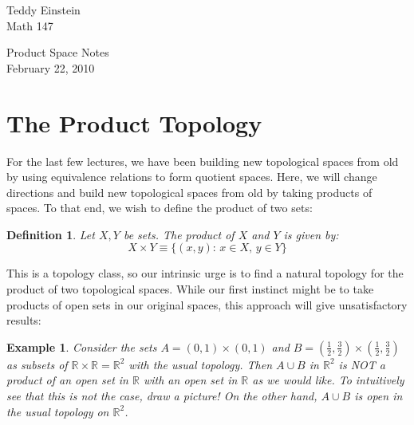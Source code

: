 \documentclass[reqno]{amsart}
\newcommand{\reals}{\mathbb{R}}
\newcommand{\half}[1]{\frac{#1}{2}}
\newtheorem{definition}[theorem]{Definition}
\newtheorem{example}[theorem]{Example}
\begin{document}
\noindent Teddy Einstein\\Math 147\\
\begin{center}
Product Space Notes\\
February 22, 2010 \\
\end{center}
\renewcommand{\labelenumi}{\roman{enumi}.}

\medskip

\section{The Product Topology}

For the last few lectures, we have been building new topological spaces from old by using equivalence relations to form quotient spaces. Here, we will change directions and build new topological spaces from old by taking products of spaces. To that end, we wish to define the product of two sets:
\begin{definition}
Let $X,Y$ be sets. The product of $X$ and $Y$ is given by:
\[X\times Y \equiv \{(x,y):\,x\in X,\,y\in Y\}\]
\end{definition}
This is a topology class, so our intrinsic urge is to find a natural topology for the product of two topological spaces. While our first instinct might be to take products of open sets in our original spaces, this approach will give unsatisfactory results:
\begin{example}
Consider the sets $A = (0,1)\times (0,1)$ and $B = (\half1,\half3)\times(\half1,\half3)$ as subsets of $\reals\times\reals = \reals^2$ with the usual topology. Then $A\cup B$ in $\reals^2$ is NOT a product of an open set in $\reals$ with an open set in $\reals$ as we would like. To intuitively see that this is not the case, draw a picture! On the other hand, $A\cup B$ is open in the usual topology on $\reals^2$.
\end{example}
\vspace{1.5in}
\end{document}
